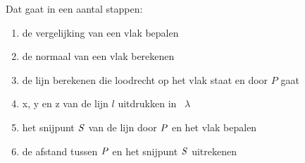 Dat gaat in een aantal stappen:
\begin{enumerate}[label=(\alph*)]
	\item de vergelijking van een vlak bepalen
	\item de normaal van een vlak berekenen
	\item de lijn berekenen die  loodrecht op het vlak staat  en door $ P $ gaat
	\item x, y en z van de lijn $  l $  uitdrukken in \ $  \lambda $
	\item het snijpunt $\it{S}$  van de lijn door $\it{P}$  en het vlak bepalen
	\item  de afstand tussen $\it{P}$  en het snijpunt $\it{S}$  uitrekenen
\end{enumerate}	


